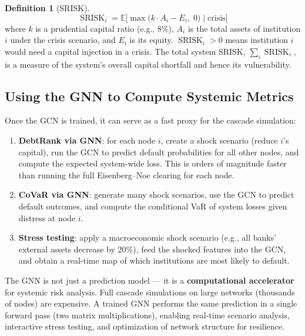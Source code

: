 \documentclass[11pt, a4paper]{article}
\theoremstyle{definition}
\newtheorem{definition}{Definition}[section]
\theoremstyle{plain}
\theoremstyle{remark}
\newcommand{\SRISK}{\operatorname{SRISK}}
\newcommand{\EV}{\mathbb{E}}
\begin{document}
\begin{definition}[SRISK]\label{def:srisk}
\begin{equation}\label{eq:srisk}
    \SRISK_i = \EV\!\bigl[\max\bigl(k \cdot A_i - E_i,\; 0\bigr) \;\big|\; \text{crisis}\bigr]
\end{equation}
where $k$ is a prudential capital ratio (e.g., 8\%), $A_i$ is the total assets of
institution $i$ under the crisis scenario, and $E_i$ is its equity.
$\SRISK_i > 0$ means institution $i$ would need a capital injection in a crisis.
The total system SRISK, $\sum_i \SRISK_i$, is a measure of the system's overall
capital shortfall and hence its vulnerability.
\end{definition}

\subsection{Using the GNN to Compute Systemic Metrics}

Once the GCN is trained, it can serve as a fast proxy for the cascade simulation:

\begin{enumerate}
    \item \textbf{DebtRank via GNN}: for each node $i$, create a shock scenario
          (reduce $i$'s capital), run the GCN to predict default probabilities
          for all other nodes, and compute the expected system-wide loss.
          This is orders of magnitude faster than running the full
          Eisenberg--Noe clearing for each node.

    \item \textbf{CoVaR via GNN}: generate many shock scenarios, use the GCN to
          predict default outcomes, and compute the conditional VaR of system
          losses given distress at node $i$.

    \item \textbf{Stress testing}: apply a macroeconomic shock scenario (e.g.,
          all banks' external assets decrease by 20\%), feed the shocked features
          into the GCN, and obtain a real-time map of which institutions are
          most likely to default.
\end{enumerate}

\begin{keyidea}
The GNN is not just a prediction model --- it is a \textbf{computational accelerator}
for systemic risk analysis.
Full cascade simulations on large networks (thousands of nodes) are expensive.
A trained GNN performs the same prediction in a single forward pass (two matrix
multiplications), enabling real-time scenario analysis, interactive stress testing,
and optimization of network structure for resilience.
\end{keyidea}
\end{document}
